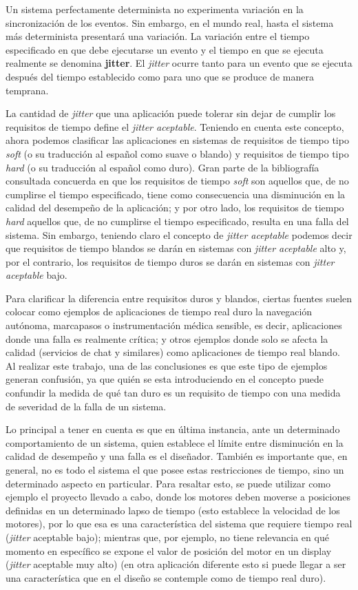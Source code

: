 \documentclass{IEEEtran}
\begin{document}
Un sistema perfectamente determinista no experimenta variación en la sincronización de los eventos. Sin embargo, en el mundo real, hasta el sistema más determinista presentará una variación. La variación entre el tiempo especificado en que debe ejecutarse un evento y el tiempo en que se ejecuta realmente se denomina \textbf{jitter}. El \textit{jitter} ocurre tanto para un evento que se ejecuta después del tiempo establecido como para uno que se produce de manera temprana.

La cantidad de \textit{jitter} que una aplicación puede tolerar sin dejar de cumplir los requisitos de tiempo define el \textit{jitter aceptable}. Teniendo en cuenta este concepto, ahora podemos clasificar las aplicaciones en sistemas de requisitos de tiempo tipo \textit{soft} (o su traducción al español como suave o blando) y requisitos de tiempo tipo \textit{hard} (o su traducción al español como duro). Gran parte de la bibliografía consultada concuerda en que los requisitos de tiempo \textit{soft} son aquellos que, de no cumplirse el tiempo especificado, tiene como consecuencia una disminución en la calidad del desempeño de la aplicación; y por otro lado, los requisitos de tiempo \textit{hard} aquellos que, de no cumplirse el tiempo especificado, resulta en una falla del sistema. Sin embargo, teniendo claro el concepto de \textit{jitter aceptable} podemos decir que requisitos de tiempo blandos se darán en sistemas con \textit{jitter aceptable} alto y, por el contrario, los requisitos de tiempo duros se darán en sistemas con \textit{jitter aceptable} bajo.

Para clarificar la diferencia entre requisitos duros y blandos, ciertas fuentes suelen colocar como ejemplos de aplicaciones de tiempo real duro la navegación autónoma, marcapasos o instrumentación médica sensible, es decir, aplicaciones donde una falla es realmente crítica; y otros ejemplos donde solo se afecta la calidad (servicios de chat y similares) como aplicaciones de tiempo real blando. Al realizar este trabajo, una de las conclusiones es que este tipo de ejemplos generan confusión, ya que quién se esta introduciendo en el concepto puede confundir la medida de qué tan duro es un requisito de tiempo con una medida de severidad de la falla de un sistema. 

Lo principal a tener en cuenta es que en última instancia, ante un determinado comportamiento de un sistema, quien establece el límite entre disminución en la calidad de desempeño y una falla es el diseñador. También es importante que, en general, no es todo el sistema el que posee estas restricciones de tiempo, sino un determinado aspecto en particular. Para resaltar esto, se puede utilizar como ejemplo el proyecto llevado a cabo, donde los motores deben moverse a posiciones definidas en un determinado lapso de tiempo (esto establece la velocidad de los motores), por lo que esa es una característica del sistema que requiere tiempo real (\textit{jitter} aceptable bajo); mientras que, por ejemplo, no tiene relevancia en qué momento en específico se expone el valor de posición del motor en un display (\textit{jitter} aceptable muy alto) (en otra aplicación diferente esto si puede llegar a ser una característica que en el diseño se contemple como de tiempo real duro).
\end{document}
